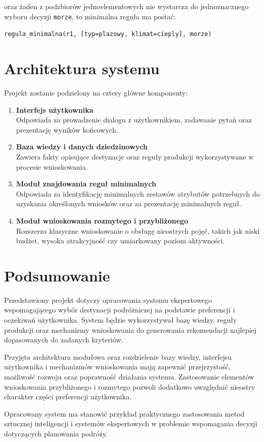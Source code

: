 \documentclass[12pt,a4paper]{article}
\begin{document}
oraz żaden z podzbiorów jednoelementowych nie wystarcza do jednoznacznego wyboru decyzji \texttt{morze}, to minimalna reguła ma postać:

\begin{center}
\texttt{regula\_minimalna(r1, [typ=plazowy, klimat=cieply], morze)}
\end{center}

\section{Architektura systemu}

Projekt zostanie podzielony na cztery główne komponenty:

\begin{enumerate}[label=\arabic*.]
    \item \textbf{Interfejs użytkownika} \\
    Odpowiada za prowadzenie dialogu z użytkownikiem, zadawanie pytań oraz prezentację wyników końcowych.

    \item \textbf{Baza wiedzy i danych dziedzinowych} \\
    Zawiera fakty opisujące destynacje oraz reguły produkcji wykorzystywane w procesie wnioskowania.

    \item \textbf{Moduł znajdowania reguł minimalnych} \\
    Odpowiada za identyfikację minimalnych zestawów atrybutów potrzebnych do uzyskania określonych wniosków oraz za prezentację minimalnych reguł.

    \item \textbf{Moduł wnioskowania rozmytego i przybliżonego} \\
    Rozszerza klasyczne wnioskowanie o obsługę nieostrych pojęć, takich jak niski budżet, wysoka atrakcyjność czy umiarkowany poziom aktywności.
\end{enumerate}



\section{Podsumowanie}

Przedstawiony projekt dotyczy opracowania systemu ekspertowego wspomagającego wybór destynacji podróżniczej na podstawie preferencji i oczekiwań użytkownika. System będzie wykorzystywał bazę wiedzy, reguły produkcji oraz mechanizmy wnioskowania do generowania rekomendacji najlepiej dopasowanych do zadanych kryteriów.

Przyjęta architektura modułowa oraz rozdzielenie bazy wiedzy, interfejsu użytkownika i mechanizmów wnioskowania mają zapewnić przejrzystość, możliwość rozwoju oraz poprawność działania systemu. Zastosowanie elementów wnioskowania przybliżonego i rozmytego pozwoli dodatkowo uwzględnić nieostry charakter części preferencji użytkownika.

Opracowany system ma stanowić przykład praktycznego zastosowania metod sztucznej inteligencji i systemów ekspertowych w problemie wspomagania decyzji dotyczących planowania podróży.
\end{document}
